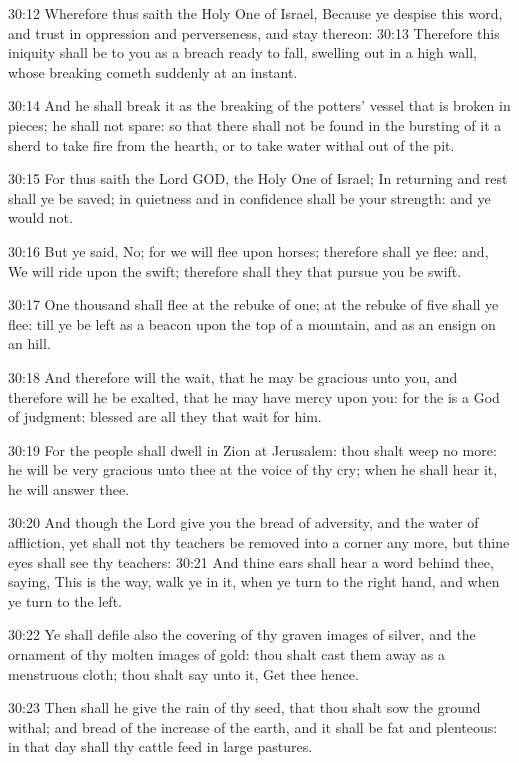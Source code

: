 30:12 Wherefore thus saith the Holy One of Israel, Because ye despise
this word, and trust in oppression and perverseness, and stay thereon:
30:13 Therefore this iniquity shall be to you as a breach ready to
fall, swelling out in a high wall, whose breaking cometh suddenly at
an instant.

30:14 And he shall break it as the breaking of the potters' vessel
that is broken in pieces; he shall not spare: so that there shall not
be found in the bursting of it a sherd to take fire from the hearth,
or to take water withal out of the pit.

30:15 For thus saith the Lord GOD, the Holy One of Israel; In
returning and rest shall ye be saved; in quietness and in confidence
shall be your strength: and ye would not.

30:16 But ye said, No; for we will flee upon horses; therefore shall
ye flee: and, We will ride upon the swift; therefore shall they that
pursue you be swift.

30:17 One thousand shall flee at the rebuke of one; at the rebuke of
five shall ye flee: till ye be left as a beacon upon the top of a
mountain, and as an ensign on an hill.

30:18 And therefore will the \LORD wait, that he may be gracious unto
you, and therefore will he be exalted, that he may have mercy upon
you: for the \LORD is a God of judgment: blessed are all they that wait
for him.

30:19 For the people shall dwell in Zion at Jerusalem: thou shalt weep
no more: he will be very gracious unto thee at the voice of thy cry;
when he shall hear it, he will answer thee.

30:20 And though the Lord give you the bread of adversity, and the
water of affliction, yet shall not thy teachers be removed into a
corner any more, but thine eyes shall see thy teachers: 30:21 And
thine ears shall hear a word behind thee, saying, This is the way,
walk ye in it, when ye turn to the right hand, and when ye turn to the
left.

30:22 Ye shall defile also the covering of thy graven images of
silver, and the ornament of thy molten images of gold: thou shalt cast
them away as a menstruous cloth; thou shalt say unto it, Get thee
hence.

30:23 Then shall he give the rain of thy seed, that thou shalt sow the
ground withal; and bread of the increase of the earth, and it shall be
fat and plenteous: in that day shall thy cattle feed in large
pastures.

